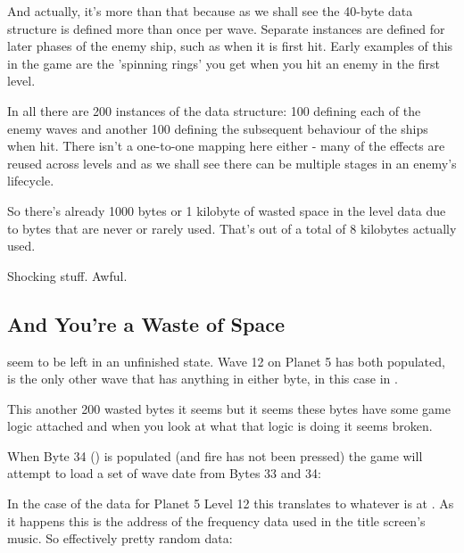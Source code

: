 And actually, it's more than that because as we shall see the  40-byte data
structure is defined more than once per wave. Separate instances are defined for later
phases of the enemy ship, such as when it is first hit. Early examples of this in the game
are the 'spinning rings' you get when you hit an enemy in the first level.

In all there are 200 instances of the  data structure: 100 defining each of the
enemy waves and another 100 defining the subsequent behaviour of the ships when hit. There isn't
a one-to-one mapping here either - many of the effects are reused across levels and as we shall
see there can be multiple stages in an enemy's lifecycle.

So there's already 1000 bytes or 1 kilobyte of wasted space in the level data due to bytes
that are never or rarely used. That's out of a total of 8 kilobytes actually used.

Shocking stuff. Awful.

\subsection{And You're a Waste of Space}

 seem to be left in an unfinished state. Wave 12 on Planet 5 has both populated, 
is the only other wave that has anything in either byte, in this case  in .

This another 200 wasted bytes it seems but it seems these bytes have some game logic attached and
when you look at what that logic is doing it seems broken.

%


When Byte 34 () is populated (and fire has not been pressed) the game will attempt to load
a set of wave date from Bytes 33 and 34:

%


In the case of the data for Planet 5 Level 12 this translates to whatever is at . As it happens this 
is the address of the frequency data used in the title screen's music. So effectively pretty random data:

